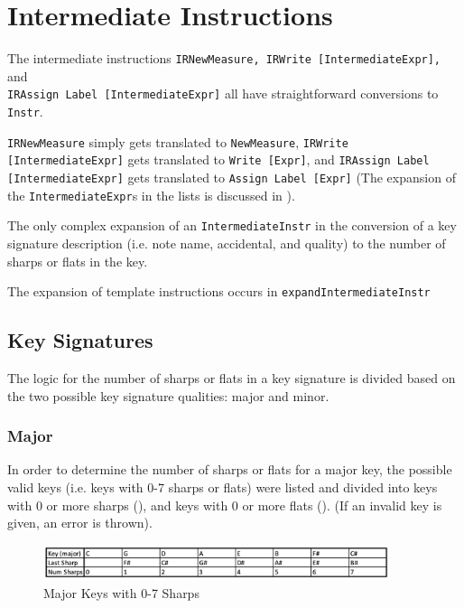 \documentclass{report}
\begin{document}
\section{Intermediate Instructions}
The intermediate instructions \verb.IRNewMeasure, IRWrite [IntermediateExpr],. and \\\verb.IRAssign Label [IntermediateExpr]. all have straightforward conversions to \verb.Instr.. 

\verb.IRNewMeasure. simply gets translated to \verb.NewMeasure., \verb.IRWrite [IntermediateExpr]. gets translated to \verb.Write [Expr]., and \verb.IRAssign Label [IntermediateExpr]. gets translated to \verb.Assign Label [Expr]. (The expansion of the \verb.IntermediateExpr.s in the lists is discussed in ). 

The only complex expansion of an \verb.IntermediateInstr. in the conversion of a key signature description (i.e. note name, accidental, and quality) to the number of sharps or flats in the key.

The expansion of template instructions occurs in \verb.expandIntermediateInstr.
\subsection{Key Signatures}
The logic for the number of sharps or flats in a key signature is divided based on the two possible key signature qualities: major and minor. 
\subsubsection{Major}

In order to determine the number of sharps or flats for a major key, the possible valid keys (i.e. keys with 0-7 sharps or flats) were listed and divided into keys with 0 or more sharps (), and keys with 0 or more flats (). (If an invalid key is given, an error is thrown).

\begin{figure}[h!]
\centering
\includegraphics[width=0.9\textwidth]{images/major_sharp}
\caption{Major Keys with 0-7 Sharps}
\label{major_sharp_keys}
\end{figure}
\end{document}
